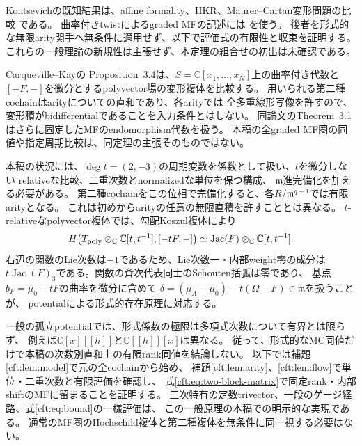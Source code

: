 Kontsevichの既知結果は、affine formality、HKR、Maurer--Cartan変形問題の比較
\cite[Theorem~4.6, Section~4.6.2, Theorem~6.3]{PKontsevich}である。
曲率付きtwistによるgraded MFの記述には
\cite[Section~2, 特にRemark~2.8とTheorem~2.12]{CT}を使う。
後者を形式的な無限arity関手へ無条件に適用せず、以下で評価式の有限性と収束を証明する。
これらの一般理論の新規性は主張せず、本定理の組合せの初出は未確認である。

\begin{remark}[既知の曲率付きformalityとの比較]\label{cft:rem:prior-formality}
Carqueville--Kay\cite[Proposition~2.3, Remark~2.4, Proposition~3.4]{CK}の
Proposition~3.4は、$S=\mathbb C[x_1,\ldots,x_N]$上の曲率付き代数と
$[-F,-]$を微分とするpolyvector場の変形複体を比較する。
用いられる第二種cochainはarityについての直和であり、各arityでは
全多重線形写像を許すので、変形積がbidifferentialであることを入力条件とはしない。
同論文のTheorem~3.1はさらに固定したMFのendomorphism代数を扱う。
本稿の全graded MF圏の同値や指定周期比較は、同定理の主張そのものではない。

本稿の状況には、$\deg t=(2,-3)$の周期変数を係数として扱い、$t$を微分しない
relativeな比較、二重次数とnormalizedな単位を保つ構成、
$\mathfrak m$進完備化を加える必要がある。
第二種cochainをこの位相で完備化すると、各$R/\mathfrak m^{q+1}$では有限arityとなる。
これは初めからarityの任意の無限直積を許すこととは異なる。
$t$-relativeなpolyvector複体では、勾配Koszul複体により
\begin{equation}\label{cft:eq:prior-jacobian}
 H\bigl(T_{\rm poly}\otimes_{\mathbb C}\mathbb C[t,t^{-1}],[-tF,-]\bigr)
 \simeq\operatorname{Jac}(F)\otimes_{\mathbb C}\mathbb C[t,t^{-1}].
\end{equation}
右辺の関数のLie次数は$-1$であるため、Lie次数一・内部weight零の成分は
$t\operatorname{Jac}(F)_3$である。関数の斉次代表同士のSchouten括弧は零であり、
基点$b_F=\mu_0-tF$の曲率を微分に含めて
$\delta=(\mu_A-\mu_0)-t(\Omega-F)\in\mathfrak m$を扱うことが、
potentialによる形式的存在原理に対応する。

一般の孤立potentialでは、形式係数の極限は多項式次数について有界とは限らず、
例えば$\mathbb C[x][[h]]$と$\mathbb C[[h]][x]$は異なる。
従って、形式的なMC同値だけで本稿の次数別直和上の有限rank同値を結論しない。
以下では補題\ref{cft:lem:model}で元の全cochainから始め、
補題\ref{cft:lem:arity}、\ref{cft:lem:flow}で単位・二重次数と有限評価を確認し、
式\eqref{cft:eq:two-block-matrix}で固定rank・内部shiftのMFに留まることを証明する。
三次特有の定数trivector、一段のゲージ経路、式\eqref{cft:eq:bound}の一様評価は、
この一般原理の本稿での明示的な実現である。
通常のMF圏のHochschild複体と第二種複体を無条件に同一視する必要はない。
\end{remark}

